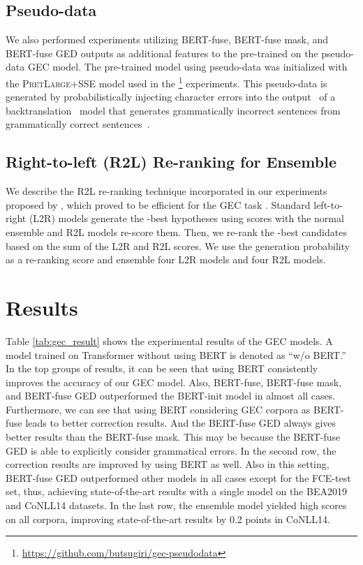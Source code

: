 \documentclass[11pt,a4paper]{article}
\begin{document}
\subsection{Pseudo-data}
We also performed experiments utilizing BERT-fuse, BERT-fuse mask, and BERT-fuse GED outputs as additional features to the pre-trained on the pseudo-data GEC model.
The pre-trained model using pseudo-data was initialized with the \textsc{PretLarge+SSE} model used in the \footnote{\url{https://github.com/butsugiri/gec-pseudodata}} experiments.
This pseudo-data is generated by probabilistically injecting character errors into the output~\cite{lichtarge-etal-2019-corpora} of a backtranslation~\cite{xie-etal-2018-noising} model that generates grammatically incorrect sentences from grammatically correct sentences~\cite{kiyono-etal-2019-empirical}.

\subsection{Right-to-left (R2L) Re-ranking for Ensemble}
We describe the R2L re-ranking technique incorporated in our experiments proposed by \citet{sennrich-etal-2016-edinburgh}, which proved to be efficient for the GEC task \cite{grundkiewicz-etal-2019-neural, kiyono-etal-2019-empirical}.
Standard left-to-right (L2R) models generate the -best hypotheses using scores with the normal ensemble and R2L models re-score them.
Then, we re-rank the -best candidates based on the sum of the L2R and R2L scores.
We use the generation probability as a re-ranking score and ensemble four L2R models and four R2L models.

\section{Results}

Table \ref{tab:gec_result} shows the experimental results of the GEC models.
A model trained on Transformer without using BERT is denoted as ``w/o BERT.''
In the top groups of results, it can be seen that using BERT consistently improves the accuracy of our GEC model.
Also, BERT-fuse, BERT-fuse mask, and BERT-fuse GED outperformed the BERT-init model in almost all cases.
Furthermore, we can see that using BERT considering GEC corpora as BERT-fuse leads to better correction results.
And the BERT-fuse GED always gives better results than the BERT-fuse mask.
This may be because the BERT-fuse GED is able to explicitly consider grammatical errors.
In the second row, the correction results are improved by using BERT as well.
Also in this setting, BERT-fuse GED outperformed other models in all cases except for the FCE-test set, thus, achieving state-of-the-art results with a single model on the BEA2019 and CoNLL14 datasets.
In the last row, the ensemble model yielded high scores on all corpora, improving state-of-the-art results by 0.2 points in CoNLL14.
\end{document}
